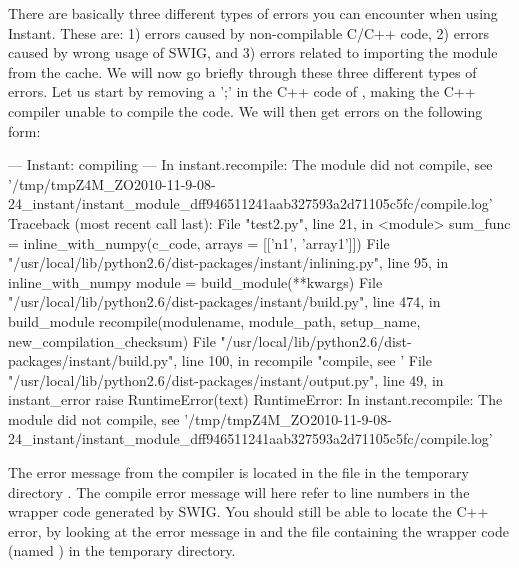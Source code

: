 There are basically three different types of errors you can encounter when using Instant. 
These are: 1) errors caused by non-compilable C/C++ code, 2) errors caused by wrong usage of SWIG, 
and 3) errors related to importing the module from the cache. We will now go briefly through 
these three different types of errors. Let us start by removing a ';' in the C++ code of
, making the C++ compiler unable to compile the code. We will then get errors on the 
following form: 
\begin{python}
--- Instant: compiling ---
In instant.recompile: The module did not compile, 
   see '/tmp/tmpZ4M_ZO2010-11-9-08-24_instant/instant_module_dff946511241aab327593a2d71105c5fc/compile.log'
Traceback (most recent call last):
      File "test2.py", line 21, in <module>
          sum_func = inline_with_numpy(c_code, arrays = [['n1', 'array1']])
        File "/usr/local/lib/python2.6/dist-packages/instant/inlining.py", line 95, in inline_with_numpy
          module = build_module(**kwargs)
        File "/usr/local/lib/python2.6/dist-packages/instant/build.py", line 474, in build_module
          recompile(modulename, module_path, setup_name, new_compilation_checksum)
        File "/usr/local/lib/python2.6/dist-packages/instant/build.py", line 100, in recompile
          "compile, see '%
        File "/usr/local/lib/python2.6/dist-packages/instant/output.py", line 49, in instant_error
          raise RuntimeError(text)
      RuntimeError: In instant.recompile: The module did not compile, 
      see '/tmp/tmpZ4M_ZO2010-11-9-08-24_instant/instant_module_dff946511241aab327593a2d71105c5fc/compile.log'
\end{python}
The error message from the compiler is located in the file  in the temporary directory 
.
The compile error message will here refer to line numbers in the wrapper code generated by SWIG. 
You should still be able to locate the C++ error, by looking at the error message in 
and the file containing the wrapper code (named ) in the temporary directory.

